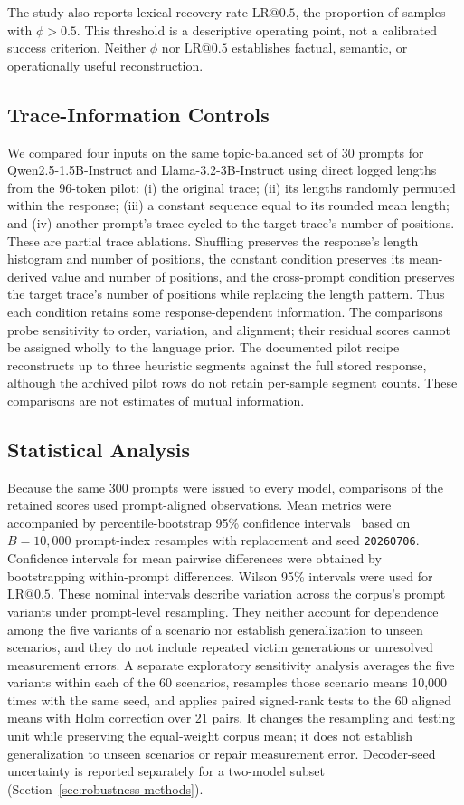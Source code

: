 \documentclass[electronics,article,submit,pdftex,moreauthors]{Definitions/mdpi}
\begin{document}
The study also reports lexical recovery rate $\mathrm{LR}@0.5$, the proportion of samples with $\phi>0.5$. This threshold is a descriptive operating point, not a calibrated success criterion. Neither $\phi$ nor $\mathrm{LR}@0.5$ establishes factual, semantic, or operationally useful reconstruction.

\subsection{Trace-Information Controls}
We compared four inputs on the same topic-balanced set of 30 prompts for Qwen2.5-1.5B-Instruct and Llama-3.2-3B-Instruct using direct logged lengths from the 96-token pilot: (i) the original trace; (ii) its lengths randomly permuted within the response; (iii) a constant sequence equal to its rounded mean length; and (iv) another prompt's trace cycled to the target trace's number of positions. These are partial trace ablations. Shuffling preserves the response's length histogram and number of positions, the constant condition preserves its mean-derived value and number of positions, and the cross-prompt condition preserves the target trace's number of positions while replacing the length pattern. Thus each condition retains some response-dependent information. The comparisons probe sensitivity to order, variation, and alignment; their residual scores cannot be assigned wholly to the language prior. The documented pilot recipe reconstructs up to three heuristic segments against the full stored response, although the archived pilot rows do not retain per-sample segment counts. These comparisons are not estimates of mutual information.

\subsection{Statistical Analysis}
Because the same 300 prompts were issued to every model, comparisons of the retained scores used prompt-aligned observations. Mean metrics were accompanied by percentile-bootstrap 95\% confidence intervals~\cite{efron1994bootstrap} based on $B=10{,}000$ prompt-index resamples with replacement and seed \texttt{20260706}. Confidence intervals for mean pairwise differences were obtained by bootstrapping within-prompt differences. Wilson 95\% intervals were used for $\mathrm{LR}@0.5$. These nominal intervals describe variation across the corpus's prompt variants under prompt-level resampling. They neither account for dependence among the five variants of a scenario nor establish generalization to unseen scenarios, and they do not include repeated victim generations or unresolved measurement errors. A separate exploratory sensitivity analysis averages the five variants within each of the 60 scenarios, resamples those scenario means 10,000 times with the same seed, and applies paired signed-rank tests to the 60 aligned means with Holm correction over 21 pairs. It changes the resampling and testing unit while preserving the equal-weight corpus mean; it does not establish generalization to unseen scenarios or repair measurement error. Decoder-seed uncertainty is reported separately for a two-model subset (Section~\ref{sec:robustness-methods}).
\end{document}
